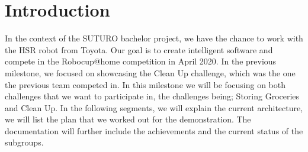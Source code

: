 \documentclass[main.tex]{subfiles}
\begin{document}
	\chapter{Introduction}
	In the context of the SUTURO bachelor project, we have the chance to work with the HSR robot from Toyota. Our goal is to create intelligent software and compete in the Robocup@home competition in April 2020. 
	In the previous milestone, we focused on showcasing the Clean Up challenge, which was the one the previous team competed in. In this milestone we will be focusing on both challenges that we want to participate in, the challenges being; Storing Groceries and Clean Up. 
	In the following segments, we will explain the current architecture, we will list the plan that we worked out for the demonstration. The documentation will further include the achievements and the current status of the subgroups.
\end{document}
